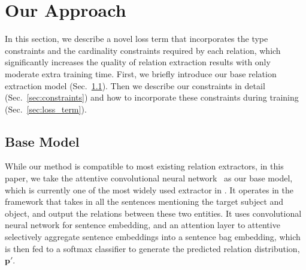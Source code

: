 \section{Our Approach}
In this section, we describe a novel loss term that incorporates the type constraints and the cardinality constraints required by each relation,
which significantly increases the quality of relation extraction results with only moderate extra training time. 
First, we briefly introduce our base relation extraction model (Sec.~\ref{sec:base_model}).
Then we describe our constraints in detail (Sec.~\ref{sec:constraints}) and how to incorporate these constraints during training (Sec.~\ref{sec:loss_term}).




\subsection{Base Model}
\label{sec:base_model}
While our method is compatible to most existing relation extractors, in this paper, we take the attentive convolutional neural network~\cite{lin2016neural} as our base model, which is currently one of the most widely used extractor in \RE.
It operates in the \MIL framework that takes in all the sentences mentioning the target subject and object, and output the relations between these two entities.
It uses convolutional neural network for sentence embedding, and an attention layer to attentive selectively aggregate sentence embeddings into a sentence bag embedding, which is then fed to a softmax classifier to generate the predicted relation distribution, $\bm{p'}$. 



